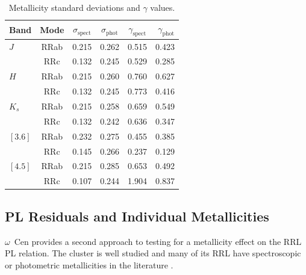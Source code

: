 \documentclass[a4paper,fleqn,usenatbib]{mnras}
\begin{document}
\begin{table}
\centering
\caption{Metallicity standard deviations and $\gamma$ values.}
\label{tab:gamma}
\begin{tabular}{lccccr} 
\hline \hline
Band & Mode & $\sigma_{\text{spect}}$ & $\sigma_{\text{phot}}$ & $\gamma_{\text{spect}}$ & $\gamma_{\text{phot}}$ \\
\hline
$J$ & RRab & 0.215 & 0.262 & 0.515 & 0.423 \\
  & RRc & 0.132 & 0.245 & 0.529 & 0.285 \\
$H$ & RRab & 0.215 & 0.260 & 0.760 & 0.627 \\
  & RRc & 0.132 & 0.245 & 0.773 & 0.416 \\
$K_s$ & RRab & 0.215 & 0.258 & 0.659 & 0.549 \\
  & RRc & 0.132 & 0.242 & 0.636 & 0.347 \\
$[3.6]$ & RRab & 0.232 & 0.275 & 0.455 & 0.385 \\
  & RRc & 0.145 & 0.266 & 0.237 & 0.129 \\
$[4.5]$ & RRab & 0.215 & 0.285 & 0.653 & 0.492 \\
  & RRc & 0.107 & 0.244 & 1.904 & 0.837 \\
\hline
\end{tabular}
\end{table}

\subsection{PL Residuals and Individual Metallicities}
\label{sec:residuals}

$\omega$~Cen provides a second approach to testing for a metallicity effect on the RRL PL relation. The cluster is well studied and many of its RRL have spectroscopic or photometric metallicities in the literature \citep[e.g.][]{2006ApJ...640L..43S, 2000AJ....119.1824R}. 
\end{document}
